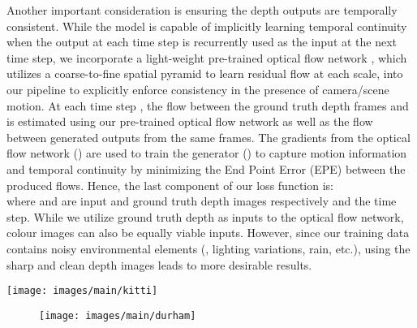 \documentclass[10pt,twocolumn,letterpaper]{article}
\begin{document}
Another important consideration is ensuring the depth outputs are temporally consistent. While the model is capable of implicitly learning temporal continuity when the output at each time step is recurrently used as the input at the next time step, we incorporate a light-weight pre-trained optical flow network \cite{ranjan2017optical}, which utilizes a coarse-to-fine spatial pyramid to learn residual flow at each scale, into our pipeline to explicitly enforce consistency in the presence of camera/scene motion. At each time step , the flow between the ground truth depth frames  and  is estimated using our pre-trained optical flow network \cite{ranjan2017optical} as well as the flow between generated outputs from the same frames. The gradients from the optical flow network () are used to train the generator () to capture motion information and temporal continuity by minimizing the End Point Error (EPE) between the produced flows. Hence, the last component of our loss function is: \vspace{-0.05cm}\\
where  and  are input and ground truth depth images respectively and  the time step. While we utilize ground truth depth as inputs to the optical flow network, colour images can also be equally viable inputs. However, since our training data contains noisy environmental elements (\eg, lighting variations, rain, etc.), using the sharp and clean depth images leads to more desirable results.\begin{figure*}[t!]
	\centering
	\texttt{[image: images/main/kitti]}
	\captionsetup[figure]{skip=7pt}
	\label{fig:kitti}\vspace{-0.4cm}
\end{figure*}
\begin{figure}[t!]
	\centering
	\texttt{[image: images/main/durham]}
	\captionsetup[figure]{skip=7pt}
	\label{fig:durham}\vspace{-0.6cm}
\end{figure}
\end{document}
